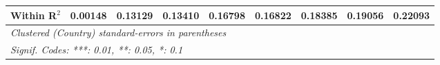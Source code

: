 \begin{table}[htbp]
\begin{tabular}{lcccccccc}
      Within R$^2$                                           & 0.00148  & 0.13129        & 0.13410        & 0.16798         & 0.16822         & 0.18385        & 0.19056         & 0.22093\\  
      \midrule \midrule
      \multicolumn{9}{l}{\emph{Clustered (Country) standard-errors in parentheses}}\\
      \multicolumn{9}{l}{\emph{Signif. Codes: ***: 0.01, **: 0.05, *: 0.1}}\\
   \end{tabular}
\end{table}


